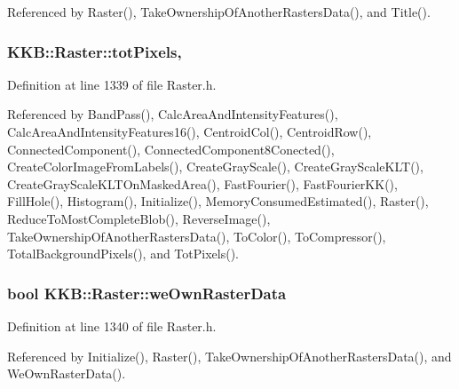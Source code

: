 Referenced by Raster(), Take\+Ownership\+Of\+Another\+Rasters\+Data(), and Title().

\subsubsection[{\texorpdfstring{tot\+Pixels}{totPixels}}]{ K\+K\+B\+::\+Raster\+::tot\+Pixels\hspace{0.3cm}{\ttfamily [mutable]}, {\ttfamily [protected]}}\hypertarget{class_k_k_b_1_1_raster_a9b08c4a0ca0a35435a478599635f1dc0}{}\label{class_k_k_b_1_1_raster_a9b08c4a0ca0a35435a478599635f1dc0}


Definition at line 1339 of file Raster.\+h.



Referenced by Band\+Pass(), Calc\+Area\+And\+Intensity\+Features(), Calc\+Area\+And\+Intensity\+Features16(), Centroid\+Col(), Centroid\+Row(), Connected\+Component(), Connected\+Component8\+Conected(), Create\+Color\+Image\+From\+Labels(), Create\+Gray\+Scale(), Create\+Gray\+Scale\+K\+L\+T(), Create\+Gray\+Scale\+K\+L\+T\+On\+Masked\+Area(), Fast\+Fourier(), Fast\+Fourier\+K\+K(), Fill\+Hole(), Histogram(), Initialize(), Memory\+Consumed\+Estimated(), Raster(), Reduce\+To\+Most\+Complete\+Blob(), Reverse\+Image(), Take\+Ownership\+Of\+Another\+Rasters\+Data(), To\+Color(), To\+Compressor(), Total\+Background\+Pixels(), and Tot\+Pixels().

\subsubsection[{\texorpdfstring{we\+Own\+Raster\+Data}{weOwnRasterData}}]{\setlength{\rightskip}{0pt plus 5cm}bool K\+K\+B\+::\+Raster\+::we\+Own\+Raster\+Data\hspace{0.3cm}{\ttfamily [protected]}}\hypertarget{class_k_k_b_1_1_raster_a3f960c2c781707efa7942d4fd2065e52}{}\label{class_k_k_b_1_1_raster_a3f960c2c781707efa7942d4fd2065e52}


Definition at line 1340 of file Raster.\+h.



Referenced by Initialize(), Raster(), Take\+Ownership\+Of\+Another\+Rasters\+Data(), and We\+Own\+Raster\+Data().

